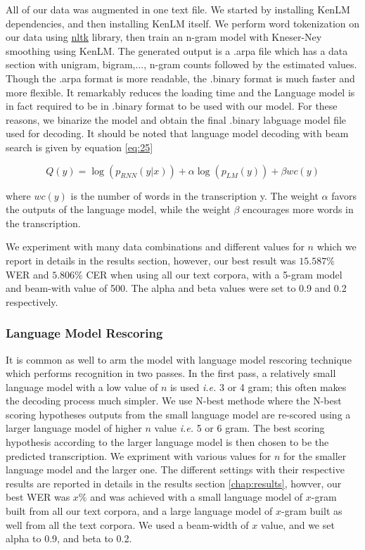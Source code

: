 All of our data was augmented in one text file. We started by installing KenLM dependencies, and then installing KenLM itself. We perform word tokenization on our data using \href{https://www.nltk.org/}{nltk} library, then train an n-gram model with Kneser-Ney smoothing using KenLM. The generated output is a .arpa file which has a data section with unigram, bigram,..., n-gram counts followed by the estimated values. Though the .arpa format is more readable, the .binary format is much faster and more flexible. It remarkably reduces the loading time and the Language model is in fact required to be in .binary format to be used with our model. For these reasons, we binarize the model and obtain the final .binary labguage model file used for decoding. It should be noted that language model decoding with beam search is given by equation \ref{eq:25}

\begin{equation}
Q(y) = \log(p_{RNN}(y|x)) + \alpha \log(p_{LM}(y)) + \beta wc(y)
\end{equation}

where $wc(y)$ is the number of words in the transcription y. The weight $\alpha$ favors the outputs of the language model, while the weight $\beta$ encourages more words in the transcription.

We experiment with many data combinations and different values for $n$ which we report in details in the results section, however, our best result was $15.587\%$ \ac{WER} and $5.806\%$ \ac{CER} when using all our text corpora, with a 5-gram model and beam-with value of 500. The alpha and beta values were set to 0.9 and 0.2 respectively.

\subsubsection{Language Model Rescoring}

It is common as well to arm the model with language model rescoring technique which performs recognition in two passes. In the first pass, a relatively small language model with a low value of $n$ is used \textit{i.e.} 3 or 4 gram; this often makes the decoding process much simpler. We use N-best methode where the N-best scoring hypotheses outputs from the small language model are re-scored using a larger language model of higher $n$ value \textit{i.e.} 5 or 6 gram. The best scoring hypothesis according to the larger language model is then chosen to be the predicted transcription.
We expriment with various values for $n$ for the smaller language model and the larger one. The different settings with their respective results are reported in details in the results section \ref{chap:results}, howver, our best \ac{WER} was $x \%$ and was achieved with a small language model of $x$-gram built from all our text corpora, and a large language model of $x$-gram built as well from all the text corpora. We used a beam-width of $x$ value, and we set alpha to 0.9, and beta to 0.2.


